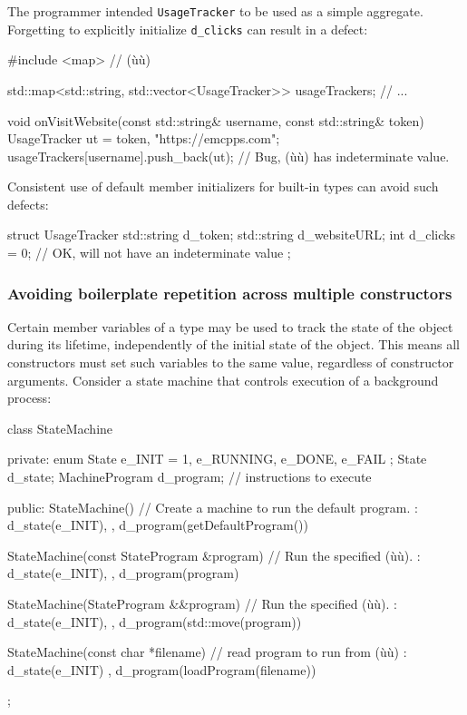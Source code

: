 The programmer intended \lstinline!UsageTracker! to be used as a simple
aggregate. Forgetting to explicitly initialize \lstinline!d_clicks! can
result in a defect:

\begin{emcppslisting}
#include <map>  // (ù{}ù)

std::map<std::string, std::vector<UsageTracker>> usageTrackers;
// ...

void onVisitWebsite(const std::string& username, const std::string& token)
{
    UsageTracker ut = {token, "https://emcpps.com"};
    usageTrackers[username].push_back(ut);
        // Bug, (ù{}ù) has indeterminate value.
}
\end{emcppslisting}
    

Consistent use of default member initializers for built-in types can
avoid such defects:

\begin{emcppslisting}
struct UsageTracker
{
    std::string d_token;
    std::string d_websiteURL;
    int         d_clicks = 0;  // OK, will not have an indeterminate value
};
\end{emcppslisting}
    

\subsubsection[Avoiding boilerplate repetition across multiple constructors]{Avoiding boilerplate repetition across multiple constructors}\label{avoiding-boilerplate-repetition-across-multiple-constructors}

Certain member variables of a type may be used to track the state of the
object during its lifetime, independently of the initial state of the
object. This means all constructors must set such variables to the same
value, regardless of constructor arguments. Consider a state machine
that controls execution of a background process:

\begin{emcppslisting}
class StateMachine
{
private:
    enum State { e_INIT = 1, e_RUNNING, e_DONE, e_FAIL };
    State          d_state;
    MachineProgram d_program;  // instructions to execute

public:
    StateMachine()  // Create a machine to run the default program.
    : d_state(e_INIT),
    , d_program(getDefaultProgram())
    { }

    StateMachine(const StateProgram &program)  // Run the specified (ù{}ù).
    : d_state(e_INIT),
    , d_program(program)
    { }

    StateMachine(StateProgram &&program)  // Run the specified (ù{}ù).
    : d_state(e_INIT),
    , d_program(std::move(program))
    { }

    StateMachine(const char *filename)  // read program to run from (ù{}ù)
    : d_state(e_INIT)
    , d_program(loadProgram(filename))
    { }
};
\end{emcppslisting}
    

